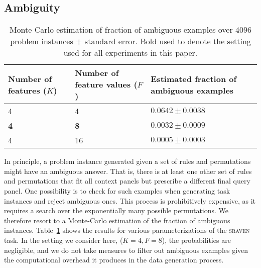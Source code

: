 \documentclass{article} \usepackage{iclr2025,times}
\begin{document}
\subsection{Ambiguity}
\label{appsec:raven-ambiguity}

\begin{table}[p]
\centering
\caption{Monte Carlo estimation of fraction of ambiguous examples over 4096 problem instances $\pm$ standard error. Bold used to denote the setting used for all experiments in this paper.}
\label{apptab:raven-ambiguous}
\begin{tabular}{@{}lll@{}}
\toprule
Number of features ($K$) & Number of feature values ($F$) & Estimated fraction of ambiguous examples \\ \midrule
4                        & 4                              & $0.0642 \pm 0.0038$                      \\
\textbf{4}               & \textbf{8}                     & $\bm{0.0032 \pm 0.0009}$             \\
4                        & 16                             & $0.0005\pm0.0003$                        \\ \bottomrule
\end{tabular}
\end{table}

In principle, a problem instance generated given a set of rules and permutations might have an ambiguous answer.
That is, there is at least one other set of rules and permutations that fit all context panels but prescribe a different final query panel.
One possibility is to check for such examples when generating task instances and reject ambiguous ones.
This process is prohibitively expensive, as it requires a search over the exponentially many possible permutations.
We therefore resort to a Monte-Carlo estimation of the fraction of ambiguous instances.
Table~\ref{apptab:raven-ambiguous} shows the results for various parameterizations of the \textsc{sraven} task.
In the setting we consider here, ($K=4, F=8$), the probabilities are negligible, and we do not take measures to filter out ambiguous examples given the computational overhead it produces in the data generation process.
\end{document}
